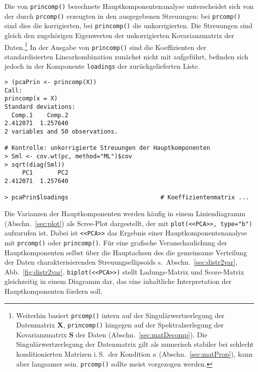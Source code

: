 Die von \lstinline!princomp()! berechnete Hauptkomponentenanalyse unterscheidet sich von der durch \lstinline!prcomp()! erzeugten in den ausgegebenen Streuungen: bei \lstinline!prcomp()! sind dies die korrigierten, bei \lstinline!princomp()! die unkorrigierten. Die Streuungen sind gleich den zugehörigen Eigenwerten der unkorrigierten Kovarianzmatrix der Daten.\footnote{Weiterhin basiert \lstinline!prcomp()! intern auf der Singulärwertzerlegung der Datenmatrix $\bm{X}$, \lstinline!princomp()! hingegen auf der Spektralzerlegung der Kovarianzmatrix $\bm{S}$ der Daten (Abschn.\ \ref{sec:matDecomp}). Die Singulärwertzerlegung der Datenmatrix gilt als numerisch stabiler bei schlecht konditionierten Matrizen i.\,S.\ der Kondition $\kappa$ (Abschn.\ \ref{sec:matProp}), kann aber langsamer sein. \lstinline!prcomp()! sollte meist vorgezogen werden.} In der Ausgabe von \lstinline!princomp()! sind die Koeffizienten der standardisierten Linearkombination zunächst nicht mit aufgeführt, befinden sich jedoch in der Komponente \lstinline!loadings! der zurückgelieferten Liste.
\begin{lstlisting}
> (pcaPrin <- princomp(X))
Call:
princomp(x = X)
Standard deviations:
  Comp.1    Comp.2
2.412071  1.257640
2 variables and 50 observations.

# Kontrolle: unkorrigierte Streuungen der Hauptkomponenten
> Sml <- cov.wt(pc, method="ML")$cov
> sqrt(diag(Sml))
     PC1       PC2
2.412071  1.257640

> pcaPrin$loadings                          # Koeffizientenmatrix ...
\end{lstlisting}

Die Varianzen der Hauptkomponenten werden häufig in einem Liniendiagramm (Abschn.\ \ref{sec:plot}) als Scree-Plot dargestellt, der mit \lstinline!plot(<<PCA>>, type="b")! aufzurufen ist. Dabei ist \lstinline!<<PCA>>! das Ergebnis einer Hauptkomponentenanalyse mit \lstinline!prcomp()! oder \lstinline!princomp()!. Für eine grafische Veranschaulichung der Hauptkomponenten selbst über die Hauptachsen des die gemeinsame Verteilung der Daten charakterisierenden Streuungsellipsoids s.\ Abschn.\ \ref{sec:distr2var}, Abb.\ \ref{fig:distr2var}. \lstinline!biplot(<<PCA>>)! stellt Ladungs-Matrix und Score-Matrix gleichzeitig in einem Diagramm dar, das eine inhaltliche Interpretation der Hauptkomponenten fördern soll.

